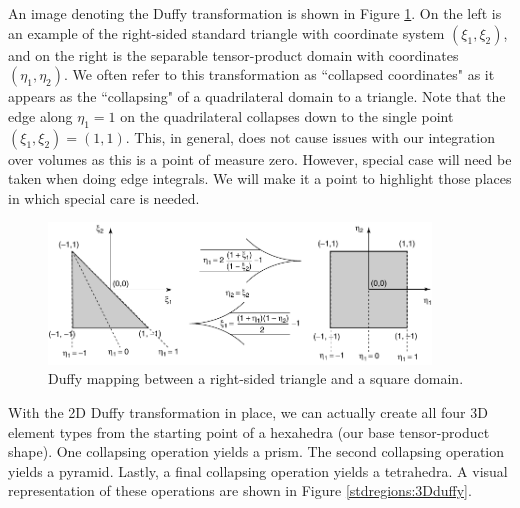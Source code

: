 An image denoting the Duffy transformation is shown in Figure \ref{stdregions:duffy}.  On the left is an example of the
right-sided standard triangle with coordinate system $(\xi_1,\xi_2)$, and on the right is the separable tensor-product
domain with coordinates $(\eta_1,\eta_2)$.  We often refer to this transformation as ``collapsed coordinates" as it
appears as the ``collapsing" of a quadrilateral domain to a triangle.    Note that the edge along $\eta_1 = 1$ on
the quadrilateral collapses down to the single point $(\xi_1,\xi_2)=(1,1)$.  This, in general, does not cause issues
with our integration over volumes as this is a point of measure zero.  However, special case will need be taken when
doing edge integrals.  We will make it a point to highlight those places in which special care is needed.

\begin{figure}[htb]
\centering
\includegraphics[width=4in]{img/afg002.pdf}
\caption{Duffy mapping between a right-sided triangle and a square domain.}
\label{stdregions:duffy}
\end{figure}


With the 2D Duffy transformation in place, we can actually create all four 3D element types from the starting point
of a hexahedra (our base tensor-product shape).  One collapsing operation yields a prism.  The second collapsing
operation yields a pyramid.  Lastly, a final collapsing operation yields a tetrahedra.  A visual representation of these
operations are shown in Figure \ref{stdregions:3Dduffy}.

